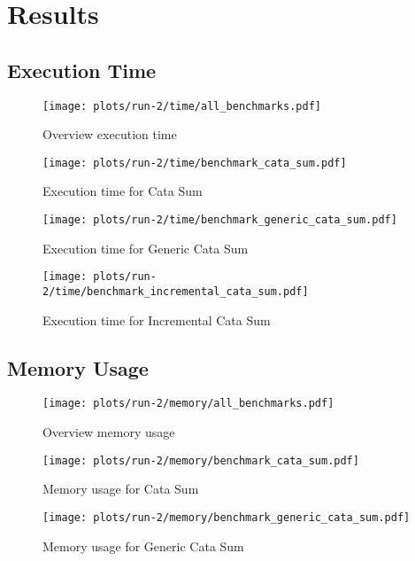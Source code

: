\section{Results}

\subsection{Execution Time}
\begin{figure}[H]
    \centering
    \texttt{[image: plots/run-2/time/all\_benchmarks.pdf]}
    \caption{Overview execution time}
    \label{fig-exec-time-overview}
\end{figure}

\begin{figure}[H]
    \centering
    \texttt{[image: plots/run-2/time/benchmark\_cata\_sum.pdf]}
    \caption{Execution time for Cata Sum}
    \label{fig-exec-time-cata-sum}
\end{figure}

\begin{figure}[H]
    \centering
    \texttt{[image: plots/run-2/time/benchmark\_generic\_cata\_sum.pdf]}
    \caption{Execution time for Generic Cata Sum}
    \label{fig-exec-time-gen-cata-sum}
\end{figure}

\begin{figure}[H]
    \centering
    \texttt{[image: plots/run-2/time/benchmark\_incremental\_cata\_sum.pdf]}
    \caption{Execution time for Incremental Cata Sum}
    \label{fig-exec-time-inc-cata-sum}
\end{figure}


\subsection{Memory Usage}
\begin{figure}[H]
    \centering
    \texttt{[image: plots/run-2/memory/all\_benchmarks.pdf]}
    \caption{Overview memory usage}
    \label{fig-bytes-all-overview}
\end{figure}

\begin{figure}[H]
    \centering
    \texttt{[image: plots/run-2/memory/benchmark\_cata\_sum.pdf]}
    \caption{Memory usage for Cata Sum}
    \label{fig-bytes-all-cata-sum}
\end{figure}

\begin{figure}[H]
    \centering
    \texttt{[image: plots/run-2/memory/benchmark\_generic\_cata\_sum.pdf]}
    \caption{Memory usage for Generic Cata Sum}
    \label{fig-bytes-all-gen-cata-sum}
\end{figure}

